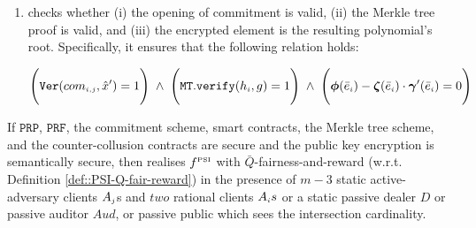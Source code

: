\begin{enumerate}
\begin{enumerate}
 \item\label{e-psi::SC-verification--check-three-vals} checks whether (i) the opening of commitment is valid,  (ii) the Merkle tree proof is valid, and (iii) the encrypted element is the resulting polynomial's root. Specifically, it ensures that the following relation holds: 
 

$$\Bigg(\mathtt{Ver}(com_{\scriptscriptstyle i,j}, \hat{x}')=1\Bigg) \hspace{1mm} \wedge \hspace{1mm} \Bigg(\mathtt{MT.verify}(h_{\scriptscriptstyle i},g)=1\Bigg) \hspace{1mm} \wedge \hspace{1mm}  \Bigg(\bm\phi( \bar{e}_{\scriptscriptstyle i})-\bm\zeta( \bar{e}_{\scriptscriptstyle i})\cdot \bm\gamma'( \bar{e}_{\scriptscriptstyle i})=0\Bigg)$$




\end{enumerate}




\end{enumerate}



 \begin{theorem}\label{theorem::E-PSI-security}
If  $\mathtt{PRP}$, $\mathtt{PRF}$, the commitment scheme, smart contracts, the Merkle tree scheme, \fpsi and the counter-collusion contracts are secure and the public key encryption is semantically secure,  then  \epsi realises  $f^{\scriptscriptstyle \text{PSI}}$ with $\bar Q$-fairness-and-reward (w.r.t. Definition \ref{def::PSI-Q-fair-reward}) in the presence of $m-3$ static active-adversary clients $A_{\scriptscriptstyle j}$s and $two$ rational clients $A_{\scriptscriptstyle i}s$ or a static passive dealer $D$ or passive auditor $Aud$, or passive public which sees the intersection cardinality.
 \end{theorem}




